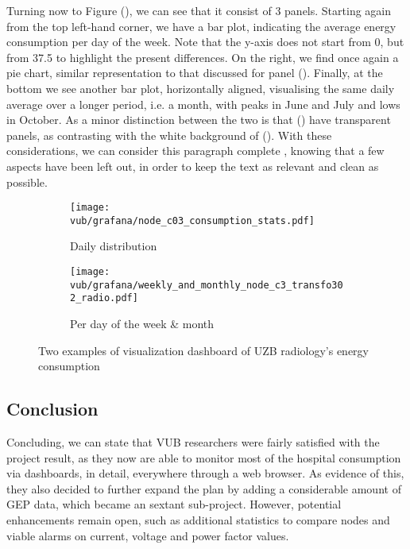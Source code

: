 Turning now to Figure (), we can see that it consist of 3 panels. Starting again from the top left-hand corner, 
we have a bar plot, indicating the average energy consumption per day of the week. %
Note that the y-axis does not start from 0, but from 37.5 to highlight the present differences. 
On the right, we find once again a pie chart, similar representation to that discussed for panel ().
Finally, at the bottom we see another bar plot, horizontally aligned, visualising the same daily average over a longer period, i.e. a month, with peaks in June and July and lows in October. 
As a minor distinction between the two is that () have transparent panels, as contrasting with the white background of (). 
With these considerations,  we can consider this paragraph complete , knowing that a few aspects have been left out, in order to keep the text as relevant and clean as possible.

\begin{figure}
    \begin{subfigure}{\textwidth}
        \texttt{[image: vub/grafana/node\_c03\_consumption\_stats.pdf]}
        \caption{Daily distribution}
        \label{fig:vub_stats_v1}
    \end{subfigure}
    \begin{subfigure}{\textwidth}
        \texttt{[image: vub/grafana/weekly\_and\_monthly\_node\_c3\_transfo302\_radio.pdf]}
        \caption{Per day of the week \& month}
        \label{fig:vub_stats_v2}
    \end{subfigure}
    \caption{Two examples of visualization dashboard of \ac{UZB} radiology's energy consumption}
    \label{fig:vub_2_dashboard}
\end{figure}

\subsection{Conclusion}
Concluding, we can state that \ac{VUB} researchers were fairly satisfied with the project result, as they now are able to monitor most of the hospital consumption via dashboards, in detail, everywhere through a web browser.
As evidence of this, they also decided to further expand the plan by adding a considerable amount of \ac{GEP} data, which became an sextant  sub-project.
However, potential enhancements remain open, such as additional statistics to compare nodes and viable alarms on current, voltage and power factor values. 


